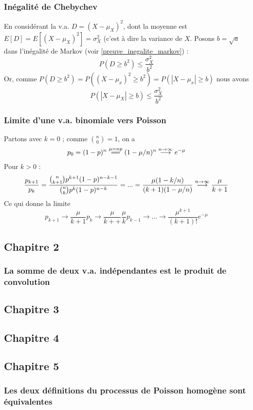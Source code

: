 \documentclass[11pt,a4paper]{article}
\numberwithin{equation}{section}
\begin{document}
\subsubsection{Inégalité de Chebychev}
\label{preuve_inegalite_chebychev}
En considérant la v.a. $D = (X-\mu_X)^2$, dont la moyenne est $E[D] = E[(X-\mu_X)^2] = \sigma_X^2$ (c'est à dire la variance de $X$. Posons $b = \sqrt{a}$ dans l'inégalité de Markov (voir \ref{preuve_inegalite_markov}) :
\[P(D \geq b^2) \leq \frac{\sigma_X^2}{b^2}\]
Or, comme $P(D \geq b^2) = P((X-\mu_x)^2 \geq b^2) = P(|X-\mu_x| \geq b)$ nous avons
\begin{equation}
    P(|X-\mu_X| \geq b) \leq \frac{\sigma_X^2}{b^2}
\end{equation}

\subsubsection{Limite d'une v.a. binomiale vers Poisson}
\label{preuve_limite_binomiale_poisson}
Partons avec $k=0$ ; comme $\binom{n}{0} = 1$, on a 
\[p_0 = (1-p)^n \overset{\mu=np}{\longeq} (1-\mu/n)^n \overset{\ninf}{\longrightarrow} e^{-\mu}\]
Pour $k > 0$ :
\[\frac{p_{k+1}}{p_k} = \frac{\binom{n}{k+1}p^{k+1}(1-p)^{n-k-1}}{\binom{n}{k}p^k(1-p)^{n-k}} = ... = \frac{\mu(1-k/n)}{(k+1)(1-\mu/n)} \overset{n \to \infty}{\longrightarrow} \frac{\mu}{k+1}\]
Ce qui donne la limite
\[p_{k+1} \to \frac{\mu}{k+1}p_k \to \frac{\mu}{k++}\frac{\mu}{k}p_{k-1} \to ... \to \frac{\mu^{k+1}}{(k+1)!}e^{-\mu}\]

\subsection{Chapitre 2}
\subsubsection{La somme de deux v.a. indépendantes est le produit de convolution}
\label{preuve_somme_va_produit_convo}
\subsection{Chapitre 3}
\subsection{Chapitre 4}
\subsection{Chapitre 5}
\subsubsection{Les deux définitions du processus de Poisson homogène sont équivalentes}
\label{preuve_egalite_definitions_processus_poisson}    
\end{document}
